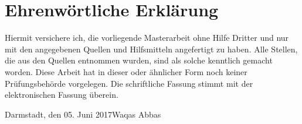 	\chapter*{Ehrenw\"ortliche Erkl\"arung}
	Hiermit versichere ich, die vorliegende Masterarbeit ohne Hilfe Dritter und nur mit den angegebenen Quellen
    und Hilfsmitteln angefertigt zu haben. Alle Stellen, die aus den Quellen entnommen wurden, sind als solche
    kenntlich gemacht worden. Diese Arbeit hat in dieser oder \"ahnlicher Form noch keiner Pr\"ufungsbeh\"orde vorgelegen.
    Die schriftliche Fassung stimmt mit der elektronischen Fassung \"uberein.
	\vspace{1.5cm}
	
	\noindent Darmstadt, den 05. Juni 2017\hfill Waqas Abbas